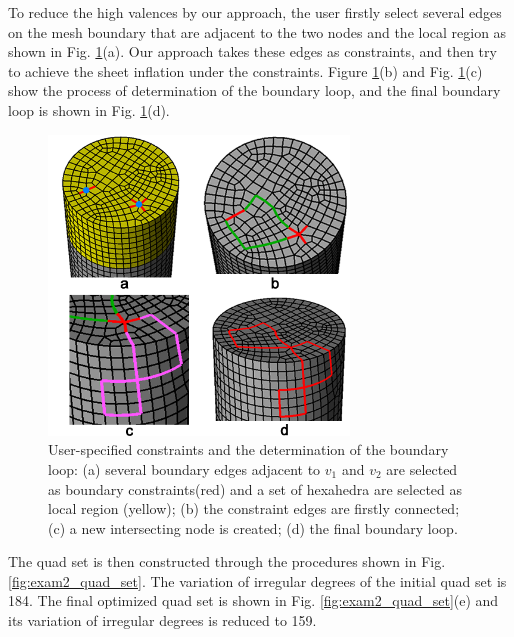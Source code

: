 \documentclass[final,5p,times,twocolumn]{elsarticle}
\begin{document}
To reduce the high valences by our approach, the user firstly select several edges on the mesh boundary that are adjacent to the two nodes and the local region as shown in Fig. \ref{fig:exam2_bound_loop}(a). Our approach takes these edges as constraints, and then try to achieve the sheet inflation under the constraints. Figure \ref{fig:exam2_bound_loop}(b) and Fig. \ref{fig:exam2_bound_loop}(c) show the process of determination of the boundary loop, and the final boundary loop is shown in Fig. \ref{fig:exam2_bound_loop}(d).

\begin{figure}[htbp]
\begin{center}
\includegraphics[width=8cm]{figures/exam2_bound_loop.png}
\caption{User-specified constraints and the determination of the boundary loop: (a) several boundary edges adjacent to $v_1$ and $v_2$ are selected as boundary constraints(red) and a set of hexahedra are selected as local region (yellow); (b) the constraint edges are firstly connected; (c) a new intersecting node is created; (d) the final boundary loop.}
\label{fig:exam2_bound_loop}
\end{center}
\end{figure}

The quad set is then constructed through the procedures shown in Fig. \ref{fig:exam2_quad_set}. The variation of irregular degrees of the initial quad set is 184. The final optimized quad set is shown in Fig. \ref{fig:exam2_quad_set}(e) and its variation of irregular degrees is reduced to 159.
\end{document}
